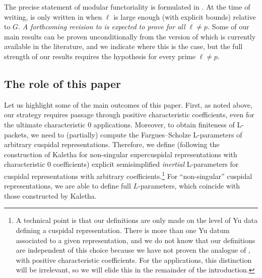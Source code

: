 \documentclass[reqno]{amsart}
\numberwithin{equation}{subsection}
\theoremstyle{remark}
\numberwithin{equation}{subsection}
\numberwithin{figure}{subsection}
\begin{document}
The precise statement of modular functoriality is formulated in \cite[Hypothesis~4.1.4]{CF26b}. At the time of writing, \cite[Hypothesis~4.1.4]{CF26b} is only written in \cite{F24} when $\ell$ is large enough (with explicit bounds) relative to $G$. \emph{A forthcoming revision to \cite{F24} is expected to prove \cite[Hypothesis~4.1.4]{CF26b} for all $\ell \neq p$.} Some of our main results can be proven unconditionally from the version of \cite[Hypothesis~4.1.4]{CF26b} which is currently available in the literature, and we indicate where this is the case, but the full strength of our results requires the hypothesis for every prime $\ell \neq p$. %

\subsection{The role of this paper} %

Let us highlight some of the main outcomes of this paper. First, as noted above, our strategy requires passage through positive characteristic coefficients, even for the ultimate characteristic 0 applications. Moreover, to obtain finiteness of L-packets, we need to (partially) compute the Fargues--Scholze L-parameters of arbitrary cuspidal representations. Therefore, we define (following the construction of Kaletha for non-singular supercuspidal representations with characteristic $0$ coefficients) explicit semisimplified \emph{inertial} L-parameters for cuspidal representations with arbitrary coefficients.\footnote{A technical point is that our definitions are only made on the level of Yu data defining a cuspidal representation. There is more than one Yu datum associated to a given representation, and we do not know that our definitions are independent of this choice because we have not proven the analogue of \cite[Theorem 6.6]{HM08}, \cite[Corollary 3.5.5]{Kal19} with positive characteristic coefficients. For the applications, this distinction will be irrelevant, so we will elide this in the remainder of the introduction.} For ``non-singular'' cuspidal representations, we are able to define full $L$-parameters, which coincide with those constructed by Kaletha.
\end{document}

